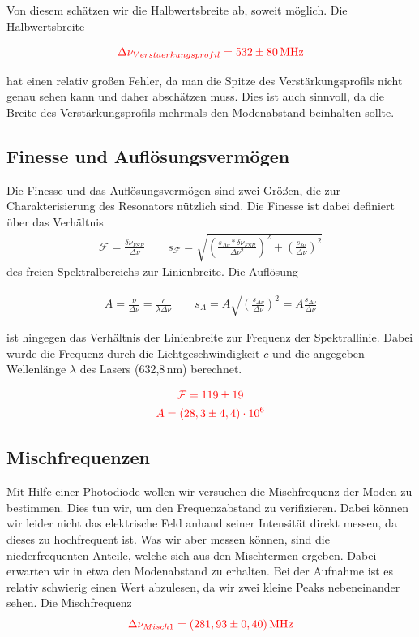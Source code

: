 Von diesem schätzen wir die Halbwertsbreite ab, soweit möglich. Die Halbwertsbreite 

\begin{equation}
    \textcolor{red}{\Delta\nu_{Verstaerkungsprofil} = 532 \pm 80 \, \mathrm{MHz}}
\end{equation}

hat einen relativ großen Fehler, da man die Spitze des Verstärkungsprofils nicht genau sehen kann und daher abschätzen muss.
Dies ist auch sinnvoll, da die Breite des Verstärkungsprofils mehrmals den Modenabstand beinhalten sollte.


\subsection*{Finesse und Auflösungsvermögen}

Die Finesse und das Auflösungsvermögen sind zwei Größen, die zur Charakterisierung des Resonators nützlich sind. Die Finesse ist dabei
definiert über das Verhältnis 
\begin{align}
    \mathcal{F} = \frac{\delta \nu_{FSR}}{\Delta\nu} \qquad s_{\mathcal{F}} = \sqrt{(\frac{s_{\Delta \nu}*\delta \nu_{FSR}}{\Delta\nu^2})^2+(\frac{s_{\delta\nu}}{\Delta \nu})^2}
\end{align}
 des freien Spektralbereichs zur Linienbreite. Die Auflösung 

 \begin{align}
     A = \frac{\nu}{\Delta\nu} = \frac{c}{\lambda\Delta\nu} \qquad s_A = A\sqrt{(\frac{s_{\Delta\nu}}{\Delta\nu})^2} = A\frac{s_{\Delta\nu}}{\Delta\nu}
 \end{align}
 
 ist hingegen das Verhältnis der Linienbreite zur Frequenz der Spektrallinie. Dabei wurde die Frequenz durch
 die Lichtgeschwindigkeit $c$ und die angegeben Wellenlänge $\lambda$ des Lasers (632,8\,nm) berechnet. 
 
 \begin{gather}
    \textcolor{red}{\mathcal{F} = 119\pm19}\\
    \textcolor{red}{A = (28,3\pm4,4)\cdot10^6}
 \end{gather}


 \subsection*{Mischfrequenzen}

 Mit Hilfe einer Photodiode wollen wir versuchen die Mischfrequenz der Moden zu bestimmen. Dies tun wir, um den Frequenzabstand zu verifizieren. 
 Dabei können wir leider nicht das elektrische Feld anhand seiner Intensität direkt messen, da dieses zu hochfrequent ist. Was wir aber messen können, sind 
 die niederfrequenten Anteile, welche sich aus den Mischtermen ergeben. Dabei erwarten wir in etwa den Modenabstand zu erhalten. 
 Bei der Aufnahme ist es relativ schwierig einen Wert abzulesen, da wir zwei kleine Peaks nebeneinander sehen. Die Mischfrequenz 
 \begin{equation*}
     \textcolor{red}{\Delta \nu_{Misch1} = (281,93\pm0,40)\,\mathrm{MHz} }
 \end{equation*}

